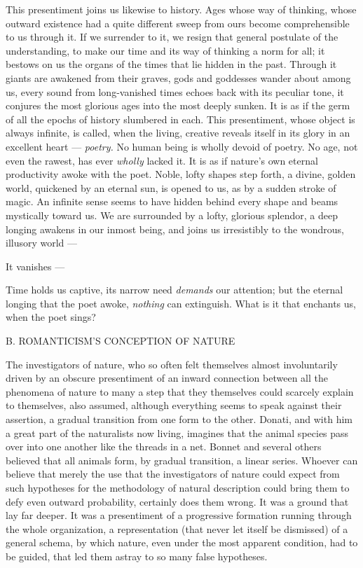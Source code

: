 \documentclass[12pt,a4paper,openany]{book}
\newcommand{\opage}[1]{\marginnote{\footnotesize\textit{[#1]}}}
\newcommand{\excerpthead}[1]{\par\bigskip\begin{center}#1\end{center}\nopagebreak\smallskip}
\begin{document}
This presentiment joins us likewise to history. Ages whose way of thinking, whose
outward existence had a quite different sweep from ours become comprehensible to us
through it. If we surrender to it, we resign that general postulate of the
understanding, to make our time and its way of thinking a norm for all; it bestows
on us the organs of the times that lie hidden in the past. Through it giants are
awakened from their graves, gods and goddesses wander about among us, every sound
from long-vanished times echoes back with its peculiar tone, it conjures the most
glorious ages into the most deeply sunken. It is as if the germ of all the epochs of
history slumbered in each. This presentiment, whose object is always infinite, is
called, when the living, creative reveals itself in its glory in an excellent
heart --- \textit{poetry.} No human being is wholly devoid of poetry. No age, not
even the rawest, has ever \textit{wholly} lacked it. It is as if nature's own
eternal productivity awoke with the poet. Noble, lofty shapes step forth, a divine,
golden world, quickened by an eternal sun, is opened to us, as by a sudden stroke of
magic. An infinite sense seems to have hidden behind every shape and beams mystically
toward us. We are surrounded by a lofty, glorious splendor, a deep longing awakens
in our inmost being, and joins us irresistibly to the wondrous, illusory world ---

It vanishes ---

Time holds us captive, its narrow need \textit{demands} our attention; but the
eternal longing that the poet awoke, \textit{nothing} can extinguish. What is it that
enchants us, when the poet sings?

\setcounter{footnote}{0}%
\excerpthead{B. ROMANTICISM'S CONCEPTION OF NATURE}\opage{49}

The investigators of nature, who so often felt themselves almost involuntarily
driven by an obscure presentiment of an inward connection between all the phenomena
of nature to many a step that they themselves could scarcely explain to themselves,
also assumed, although everything seems to speak against their assertion, a gradual
transition from one form to the other. Donati, and with him a great part of the
naturalists now living, imagines that the animal species pass over into one another
like the threads in a net. Bonnet and several others believed that all animals form,
by gradual transition, a linear series. Whoever can believe that merely the use that
the investigators of nature could expect from such hypotheses for the methodology of
natural description could bring them to defy even outward probability, certainly does
them wrong. It was a ground that lay far deeper. It was a presentiment of a
progressive formation running through the whole organization, a representation (that
never let itself be dismissed) of a general schema, by which nature, even under the
most apparent condition, had to be guided, that led them astray to so many false
hypotheses.
\end{document}
